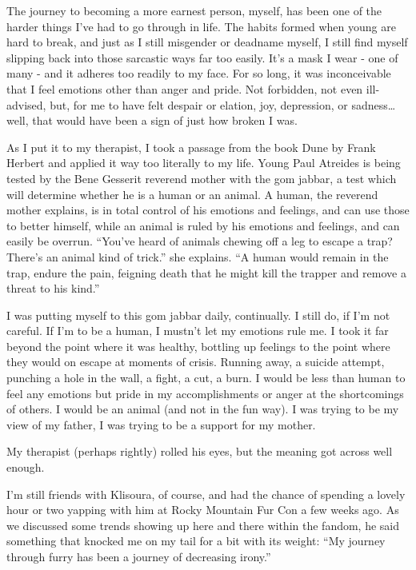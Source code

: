 The journey to becoming a more earnest person, myself, has been one of the harder things I've had to go through in life. The habits formed when young are hard to break, and just as I still misgender or deadname myself, I still find myself slipping back into those sarcastic ways far too easily. It's a mask I wear - one of many - and it adheres too readily to my face. For so long, it was inconceivable that I feel emotions other than anger and pride. Not forbidden, not even ill-advised, but, for me to have felt despair or elation, joy, depression, or sadness\ldots{}well, that would have been a sign of just how broken I was.

As I put it to my therapist, I took a passage from the book Dune by Frank Herbert and applied it way too literally to my life. Young Paul Atreides is being tested by the Bene Gesserit reverend mother with the gom jabbar, a test which will determine whether he is a human or an animal. A human, the reverend mother explains, is in total control of his emotions and feelings, and can use those to better himself, while an animal is ruled by his emotions and feelings, and can easily be overrun. ``You've heard of animals chewing off a leg to escape a trap? There's an animal kind of trick.'' she explains. ``A human would remain in the trap, endure the pain, feigning death that he might kill the trapper and remove a threat to his kind.''

I was putting myself to this gom jabbar daily, continually. I still do, if I'm not careful. If I'm to be a human, I mustn't let my emotions rule me. I took it far beyond the point where it was healthy, bottling up feelings to the point where they would on escape at moments of crisis. Running away, a suicide attempt, punching a hole in the wall, a fight, a cut, a burn. I would be less than human to feel any emotions but pride in my accomplishments or anger at the shortcomings of others. I would be an animal (and not in the fun way). I was trying to be my view of my father, I was trying to be a support for my mother.

My therapist (perhaps rightly) rolled his eyes, but the meaning got across well enough.

I'm still friends with Klisoura, of course, and had the chance of spending a lovely hour or two yapping with him at Rocky Mountain Fur Con a few weeks ago. As we discussed some trends showing up here and there within the fandom, he said something that knocked me on my tail for a bit with its weight: ``My journey through furry has been a journey of decreasing irony.''

